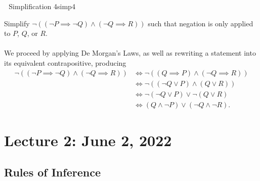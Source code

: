         \begin{exercise}{\Difficulty\,\Difficulty\,\Difficulty\,\,Simplification 4}{simp4}
        
            Simplify \(\neg((\neg P\implies\neg Q)\wedge (\neg Q\implies R))\) such that negation is only applied to \(P\), \(Q\), or \(R\).
            \\
            \\
            We proceed by applying De Morgan's Laws, as well as rewriting a statement into its equivalent contrapositive, producing
            \begin{align*}
                \neg((\neg P\implies\neg Q)\wedge (\neg Q\implies R))&\iff\neg((Q\implies P)\wedge (\neg Q\implies R)) \\
                &\iff\neg((\neg Q\vee P)\wedge ( Q\vee R)) \\
                &\iff\neg(\neg Q\vee P)\vee \neg(Q\vee R) \\
                &\iff(Q\wedge \neg P)\vee (\neg Q\wedge \neg R).
            \end{align*}
        
        \end{exercise}
    
    \pagebreak
    
    
    
\section{Lecture 2: June 2, 2022}

    \subsection{Rules of Inference}
    
